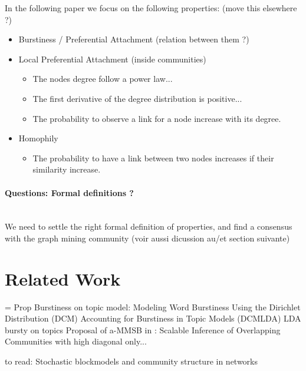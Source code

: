 \documentclass[a4paper, 12pt]{article}
\begin{document}
In the following paper we focus on the following properties: (move this elsewhere ?)
\begin{itemize}
	\item Burstiness / Preferential Attachment (relation between them ?)
	\item Local Preferential Attachment (inside communities)
		\begin{itemize}
			\item The nodes degree follow a power law...
			\item The first derivative of the degree distribution is positive...
			\item The probability to observe a link for a node increase with its degree.
		\end{itemize}

	\item Homophily
		\begin{itemize}
			\item The probability to have a link between two nodes increases if their similarity increase.
		\end{itemize}
\end{itemize}

\paragraph{Questions: Formal definitions ?}~\\
We need to settle the right formal definition of properties, and find a consensus with the graph mining community (voir aussi dicussion au/et section suivante)



\section{Related Work}
= Prop
Burstiness on topic model:
Modeling Word Burstiness Using the Dirichlet Distribution (DCM)
Accounting for Burstiness in Topic Models (DCMLDA)
LDA bursty on topics
Proposal of a-MMSB in : Scalable Inference of Overlapping Communities
with high diagonal only...

to read: Stochastic blockmodels and community structure in networks
\end{document}
